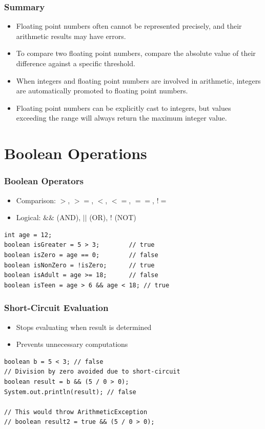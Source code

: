 \documentclass[serif, aspectratio=169]{beamer}
\begin{document}
\begin{frame}[fragile]
\frametitle{Summary}
\begin{itemize}
    \item Floating point numbers often cannot be represented precisely, and their arithmetic results may have errors.
    \item To compare two floating point numbers, compare the absolute value of their difference against a specific threshold.
    \item When integers and floating point numbers are involved in arithmetic, integers are automatically promoted to floating point numbers.
    \item Floating point numbers can be explicitly cast to integers, but values exceeding the range will always return the maximum integer value.
\end{itemize}
\end{frame}

\section{Boolean Operations}
\begin{frame}[fragile]
\frametitle{Boolean Operators}
\begin{itemize}
    \item Comparison: $>$, $>=$, $<$, $<=$, $==$, $!=$
    \item Logical: $\&\&$ (AND), $||$ (OR), $!$ (NOT)
\end{itemize}
\begin{lstlisting}
int age = 12;
boolean isGreater = 5 > 3;        // true
boolean isZero = age == 0;        // false
boolean isNonZero = !isZero;      // true
boolean isAdult = age >= 18;      // false
boolean isTeen = age > 6 && age < 18; // true
\end{lstlisting}
\end{frame}

\begin{frame}[fragile]
\frametitle{Short-Circuit Evaluation}
\begin{itemize}
    \item Stops evaluating when result is determined
    \item Prevents unnecessary computations
\end{itemize}
\begin{lstlisting}
boolean b = 5 < 3; // false
// Division by zero avoided due to short-circuit
boolean result = b && (5 / 0 > 0);
System.out.println(result); // false

// This would throw ArithmeticException
// boolean result2 = true && (5 / 0 > 0);
\end{lstlisting}
\end{frame}
\end{document}
